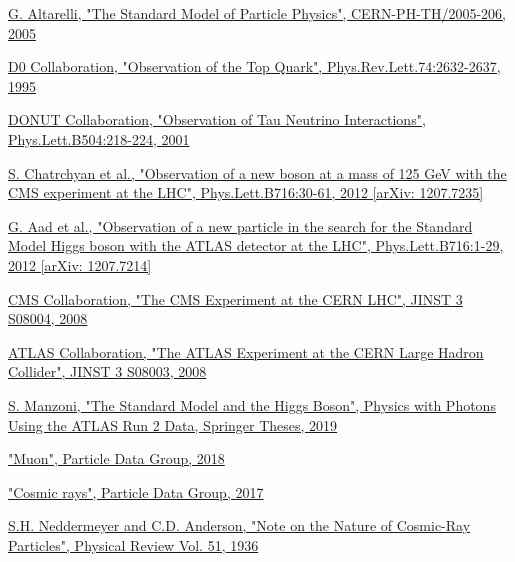 \documentclass[a4paper, 11pt]{report}
\begin{document}


\begin{thebibliography}{1}

\href{https://arxiv.org/abs/hep-ph/0510281}{G. Altarelli,
"The Standard Model of Particle Physics",
CERN-PH-TH/2005-206, 2005}

\href{https://arxiv.org/abs/hep-ex/9503003}{D0 Collaboration,
"Observation of the Top Quark",
Phys.Rev.Lett.74:2632-2637, 1995}

\href{https://arxiv.org/abs/hep-ex/0012035}{DONUT Collaboration, 
"Observation of Tau Neutrino Interactions",
Phys.Lett.B504:218-224, 2001}

\href{https://arxiv.org/abs/1207.7235}{S. Chatrchyan et al.,
"Observation of a new boson at a mass of 125 GeV with the CMS experiment at the LHC",
Phys.Lett.B716:30-61, 2012 [arXiv: 1207.7235]
}

\href{https://arxiv.org/abs/1207.7214}{G. Aad et al.,
"Observation of a new particle in the search for the Standard Model Higgs boson with the ATLAS detector at the LHC", 
Phys.Lett.B716:1-29, 2012 [arXiv: 1207.7214]}

\href{http://inspirehep.net/record/796887/}{CMS Collaboration,
"The CMS Experiment at the CERN LHC",
JINST 3 S08004, 2008}

\href{http://inspirehep.net/record/796888/}{ATLAS Collaboration,
"The ATLAS Experiment at the CERN Large Hadron Collider",
JINST 3 S08003, 2008}

\href{https://link.springer.com/chapter/10.1007/978-3-030-24370-8_2#citeas}{S. Manzoni, 
"The Standard Model and the Higgs Boson",
Physics with Photons Using the ATLAS Run 2 Data, Springer Theses, 2019
}

\href{http://pdg.lbl.gov/2018/listings/rpp2018-list-muon.pdf}{
"Muon", Particle Data Group, 2018}

\href{http://pdg.lbl.gov/2017/reviews/rpp2017-rev-cosmic-rays.pdf}{
"Cosmic rays", Particle Data Group, 2017}

\href{http://web.ihep.su/dbserv/compas/src/neddermeyer37/eng.pdf}{S.H. Neddermeyer and C.D. Anderson,
"Note on the Nature of Cosmic-Ray Particles", 
Physical Review Vol. 51, 1936}


\end{thebibliography}
\end{document}
